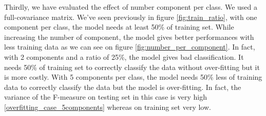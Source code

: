 Thirdly, we have evaluated the effect of number component per class. We used a full-covariance matrix. We've seen previously in figure \ref{fig:train_ratio}, with one component per class, the model needs at least 50\% of training set. While increasing the number of component, the model gives better performances with less training data as we can see on figure \ref{fig:number_per_component}. In fact, with 2 components and a ratio of 25\%, the model gives bad classification. It needs 50\% of training set to correctly classify the data without over-fitting but it is more costly. With 5 components per class, the model needs 50\% less of training data to correctly classify the data but the model is over-fitting. In fact, the variance of the F-measure on testing set in this case is very high \ref{overfitting_case_5components} whereas on training set very low.

